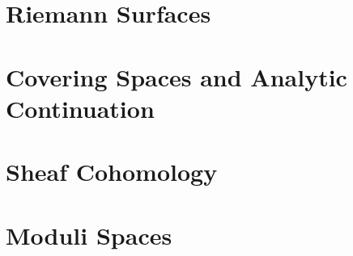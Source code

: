 \documentclass[a4paper, 8pt, notitlepage]{extreport}
\begin{document}
    

    \chapter{Riemann Surfaces}\label{cpt:Riemann_surfaces}
    
    

    \chapter{Covering Spaces and Analytic Continuation}\label{cpt:covering_spaces_analytic_continuation}
    
    
    

    \chapter{Sheaf Cohomology}\label{cpt:sheaf_cohomology}
    

    \chapter{Moduli Spaces}\label{ctp:moduli_spaces}
    
    

    \printbibliography[title={References}]
\end{document}
